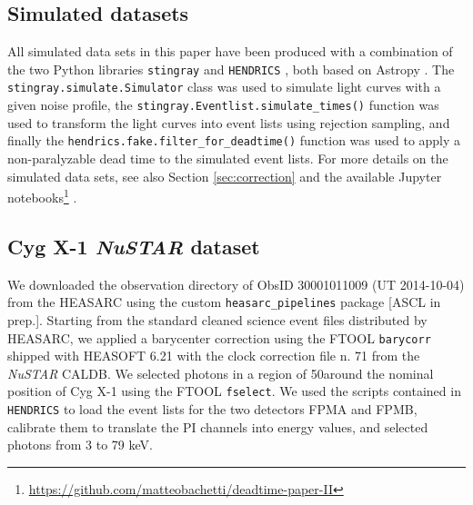 \documentclass[twocolumn]{aastex61}
\newcommand{\project}[1]{\textsl{#1}}
\newcommand{\nustar}{\project{NuSTAR}\xspace}
\begin{document}
\subsection{Simulated datasets}
All simulated data sets in this paper have been produced with a combination of the two Python libraries \texttt{stingray} \citep{huppenkothen2016} and \texttt{HENDRICS} \citep[formerly known as MaLTPyNT][]{2015ascl.soft02021B}, both based on Astropy \citep{astropy2013}.
The \texttt{stingray.simulate.Simulator} class was used to simulate light curves with a given noise profile, 
the \texttt{stingray.Eventlist.simulate\_times()} function was used to transform the light curves into event lists using rejection sampling, 
and finally the \texttt{hendrics.fake.filter\_for\_deadtime()} function was used to apply a non-paralyzable dead time to the simulated event lists. For more details on the simulated data sets, see also Section \ref{sec:correction} and the available Jupyter notebooks\footnote{\href{https://github.com/matteobachetti/deadtime-paper-II}{https://github.com/matteobachetti/deadtime-paper-II}} \citep[for a description of Jupyter notebooks, see][]{kluyver2016jupyter}.

\subsection{Cyg X-1 \nustar dataset}
We downloaded the observation directory of ObsID 30001011009 (UT 2014-10-04) from the HEASARC using the custom \texttt{heasarc\_pipelines} package [ASCL in prep.]. 
Starting from the standard cleaned science event files distributed by HEASARC, we applied a barycenter correction using the FTOOL \texttt{barycorr} shipped with HEASOFT 6.21 with the clock correction file n. 71 from the \nustar CALDB.
We selected photons in a region of 50\arcsec around the nominal position of Cyg X-1 using the FTOOL \texttt{fselect}.
We used the scripts contained in \texttt{HENDRICS} to load the event lists for the two detectors FPMA and FPMB, calibrate them to translate the PI channels into energy values, and selected photons from 3 to 79 keV.
\end{document}
